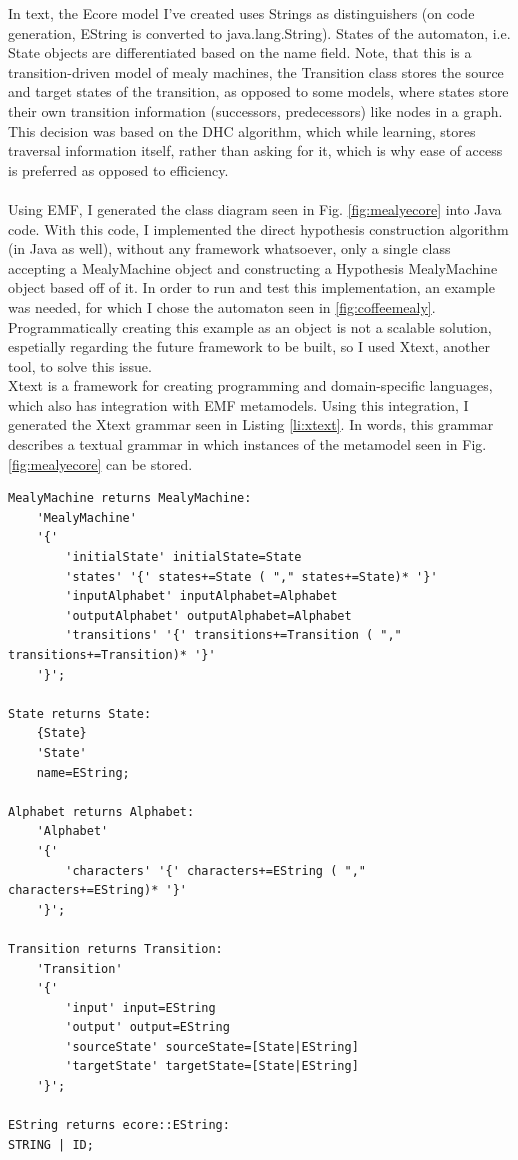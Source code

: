 In text, the Ecore model I've created uses Strings as distinguishers (on code generation, EString is converted to java.lang.String). States of the automaton, i.e. State objects are differentiated based on the name field. Note, that this is a transition-driven model of mealy machines, the Transition class stores the source and target states of the transition, as opposed to some models, where states store their own transition information (successors, predecessors) like nodes in a graph. This decision was based on the DHC algorithm, which while learning, stores traversal information itself, rather than asking for it, which is why ease of access is preferred as opposed to efficiency.
\\\\
Using EMF, I generated the class diagram seen in Fig. \ref{fig:mealyecore} into Java code. With this code, I implemented the direct hypothesis construction algorithm (in Java as well), without any framework whatsoever, only a single class accepting a MealyMachine object and constructing a Hypothesis MealyMachine object based off of it. In order to run and test this implementation, an example was needed, for which I chose the automaton seen in \ref{fig:coffeemealy}. Programmatically creating this example as an object is not a scalable solution, espetially regarding the future framework to be built, so I used Xtext, another tool, to solve this issue.
\\
Xtext is a framework for creating programming and domain-specific languages, which also has integration with EMF metamodels. Using this integration, I generated the Xtext grammar seen in Listing \ref{li:xtext}. In words, this  grammar describes a textual grammar in which instances of the metamodel seen in Fig. \ref{fig:mealyecore} can be stored. 



\begin{lstlisting}[caption=Xtext grammar describing Mealy machines.,label=li:xtext]
MealyMachine returns MealyMachine:
	'MealyMachine'
	'{'
		'initialState' initialState=State
		'states' '{' states+=State ( "," states+=State)* '}' 
		'inputAlphabet' inputAlphabet=Alphabet
		'outputAlphabet' outputAlphabet=Alphabet
		'transitions' '{' transitions+=Transition ( "," transitions+=Transition)* '}' 
	'}';
	
State returns State:
	{State}
	'State'
	name=EString;

Alphabet returns Alphabet:
	'Alphabet'
	'{'
		'characters' '{' characters+=EString ( "," characters+=EString)* '}' 
	'}';

Transition returns Transition:
	'Transition'
	'{'
		'input' input=EString
		'output' output=EString
		'sourceState' sourceState=[State|EString]
		'targetState' targetState=[State|EString]
	'}';

EString returns ecore::EString:
STRING | ID;
\end{lstlisting}

